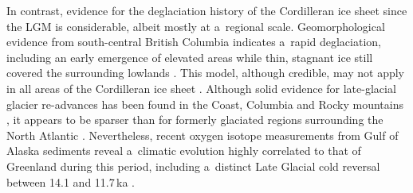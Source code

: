 \documentclass[tc, manuscript]{copernicus}
\begin{document}
      In contrast, evidence for the deglaciation history of the Cordilleran
      ice sheet since the LGM is considerable, albeit mostly at a~regional
      scale. Geomorphological evidence from south-central British Columbia
      indicates a~rapid deglaciation, including an early emergence of
      elevated areas while thin, stagnant ice still covered the surrounding
      lowlands \citep{Fulton.1967, Fulton.1991, Margold.etal.2011,
      Margold.etal.2013a}. This model, although credible, may not apply in
      all areas of the Cordilleran ice sheet \citep{Margold.etal.2013}.
      Although solid evidence for late-glacial glacier re-advances has been
      found in the Coast, Columbia and Rocky mountains
      \citep{Reasoner.etal.1994, Osborn.Gerloff.1997,
      Clague.etal.1997, Friele.Clague.2002, Friele.Clague.2002a,
      Kovanen.2002, Kovanen.Easterbrook.2002, Lakeman.etal.2008,
      Menounos.etal.2008}, it appears to be sparser than for formerly
      glaciated regions surrounding the North Atlantic
      \citep[e.g.,][]{Sissons.1979, Lundqvist.1987, Ivy-Ochs.etal.1999,
      Stea.etal.2011}. Nevertheless, recent oxygen isotope measurements from
      Gulf of Alaska sediments reveal a~climatic evolution highly correlated
      to that of Greenland during this period, including a~distinct Late
      Glacial cold reversal between 14.1 and 11.7\,\unit{ka}
      \citep{Praetorius.Mix.2014}.
\end{document}
